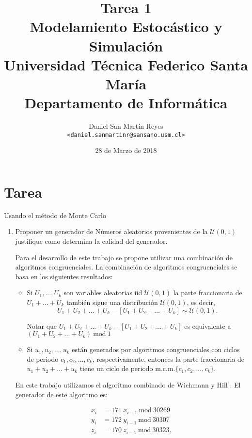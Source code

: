 \documentclass[12pt]{article}
\title{
  \large{\textbf{Tarea 1\\ Modelamiento Estocástico y Simulación}} \\
	\normalsize{Universidad Técnica Federico Santa María\\ Departamento de Informática\\}
}
\author{
  \normalsize Daniel San Martín Reyes \\ 
  \normalsize \texttt{<daniel.sanmartinr@sansano.usm.cl>}
}
\date{28 de Marzo de 2018}
\begin{document}
  \maketitle
      
  \section*{Tarea}
    Usando el método de Monte Carlo
    
    \begin{enumerate}
      \item Proponer un generador de Números aleatorios provenientes de la $\mathcal{U}(0,1)$ 
        justifique como determina la calidad del generador.

        Para el desarrollo de este trabajo se propone utilizar una combinación de algoritmos
        congruenciales. La combinación de algoritmos congruenciales se basa en
        los siguientes resultados:

        \begin{itemize}
          \item Si $U_1, ..., U_k$ son variables aleatorias iid $\mathcal{U}(0,1)$ la parte
            fraccionaria de $U_1 + ... + U_k$ también sigue una distribución $\mathcal{U}(0,1)$,
            es decir, 
            \begin{equation}
              U_1 + U_2 + ... + U_k - [U_1 + U_2 + ... + U_k] \sim \mathcal{U}(0,1).
            \end{equation}

            Notar que $U_1 + U_2 + ... + U_k - [U_1 + U_2 + ... + U_k]$ es equivalente a 
            $(U_1 + U_2 + ... + U_k) ~ \textrm{mod} ~ 1$

          \item Si $u_1, u_2, ..., u_k$ están generados por algoritmos congruenciales con ciclos 
            de periodo $c_1, c_2, ..., c_k$, respectivamente, entonces la parte fraccionaria de 
            $u_1+u_2+...+u_k$ tiene un ciclo de periodo $\textrm{m.c.m.}\{c_1, c_2, ..., c_k\}$.
        \end{itemize}

        En este trabajo utilizamos el algoritmo combinado de Wichmann y Hill \cite{wichmann1982algorithm}.
        El generador de este algoritmo es:
        
        \begin{equation}
          \begin{split}
            x_i & = 171 ~ x_{i-1} ~ \textrm{mod} ~ 30269 \\
            y_i & = 172 ~ y_{i-1} ~ \textrm{mod} ~ 30307 \\
            z_i & = 170 ~ z_{i-1} ~ \textrm{mod} ~ 30323,
          \end{split}          
        \end{equation}


\end{enumerate}
\end{document}
